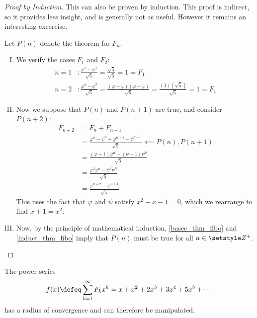 \begin{proof}[Proof by Induction]
 This can also be proven by induction. This proof is indirect, so it provides
 less insight, and is generally not as useful. However it remains an
 interesting excercise.

 Let \(P(n)\) denote the theorem for \(F_n\).
 \begin{enumerate}[I.]
  \item \label{basec_thm_fibo} We verify the cases \(F_1\) and \(F_2\):
        \begin{align*}
            n = 1&\colon \frac{\varphi^1 - \psi^1}{\sqrt 5}
                = \frac{\sqrt 5}{\sqrt 5} = 1 = F_1 \\
            n = 2&\colon \frac{\varphi^2 - \psi^2}{\sqrt 5}
                = \frac{(\varphi + \psi)(\varphi - \psi)}{\sqrt 5}
                = \frac{(1)(\sqrt 5)}{\sqrt 5}= 1 = F_1
        \end{align*}
  \item \label{induct_thm_fibo} Now we suppose that \(P(n)\) and \(P(n + 1)\)
        are true, and consider \(P(n + 2)\):
        \begin{align*}
            F_{n + 2} &= F_n + F_{n + 1} \\
                      &= \frac{\varphi^n - \psi^n +
                               \varphi^{n + 1} - \psi^{n + 1}}
                              {\sqrt 5} \impliedby P(n), P(n + 1) \\
                      &= \frac{(\varphi + 1)\varphi^n - (\psi + 1)\psi^n}
                               {\sqrt 5} \\
                      &= \frac{\varphi^2\varphi^n - \psi^2\psi^n}{\sqrt 5} \\
                      &= \frac{\varphi^{n + 2} - \psi^{n + 1}}{\sqrt 5}
        \end{align*}
        This uses the fact that \(\varphi\) and \(\psi\) satisfy
        \(x^2 - x - 1 = 0\), which we rearrange to find \(x + 1 = x^2\).
  \item Now, by the principle of mathematical induction, \ref{basec_thm_fibo}
        and \ref{induct_thm_fibo} imply that \(P(n)\) must be true for all \(n
        \in \Integers^+\). \qedhere
 \end{enumerate}
\end{proof}
\begin{lemma}
\label{lem_fibo_convergence}
 The power series
 \begin{equation*}
  f(x) \defeq \sum_{k=1}^\infty F_k x^k = x + x^2 + 2x^3 + 3x^4 + 5x^5
      + \dotsb
 \end{equation*}
 has a radius of convergence and can therefore be manipulated.
\end{lemma}
